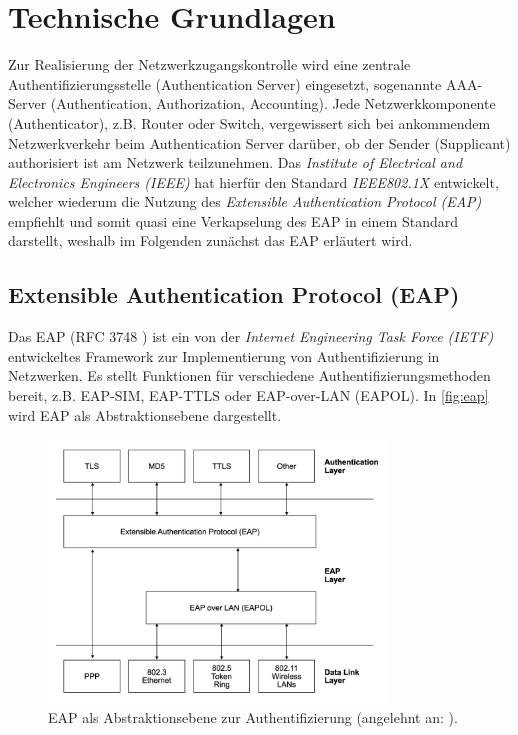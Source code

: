 \documentclass[conference]{IEEEtran}
\begin{document}
\section{Technische Grundlagen}
Zur Realisierung der Netzwerkzugangskontrolle wird eine zentrale Authentifizierungsstelle (Authentication Server) eingesetzt, sogenannte AAA-Server (Authentication, Authorization, Accounting). Jede Netzwerkkomponente (Authenticator), z.B. Router oder Switch, vergewissert sich bei ankommendem Netzwerkverkehr beim Authentication Server darüber, ob der Sender (Supplicant) authorisiert ist am Netzwerk teilzunehmen. Das \emph{Institute of Electrical and Electronics Engineers (IEEE)} hat hierfür den Standard \emph{IEEE802.1X} \cite{5409813} entwickelt, welcher wiederum die Nutzung des \emph{Extensible Authentication Protocol (EAP)} empfiehlt und somit quasi eine Verkapselung des EAP in einem Standard darstellt, weshalb im Folgenden zunächst das EAP erläutert wird.

\vspace{.5em}
\subsection{Extensible Authentication Protocol (EAP)}
Das EAP (RFC 3748 \cite{aboba2004extensible}) ist ein von der \emph{Internet Engineering Task Force (IETF)} entwickeltes Framework zur Implementierung von Authentifizierung in Netzwerken. Es stellt Funktionen für verschiedene Authentifizierungsmethoden bereit, z.B. EAP-SIM, EAP-TTLS oder EAP-over-LAN (EAPOL). \cite{1561920} In \autoref{fig:eap} wird EAP als Abstraktionsebene dargestellt.\\

\begin{figure}[hbt]
	\centering
	\includegraphics[width=9cm]{figures/EAP}
	\caption{EAP als Abstraktionsebene zur Authentifizierung (angelehnt an: \cite{1561920}).}
	\label{fig:eap}
\end{figure}
\end{document}
